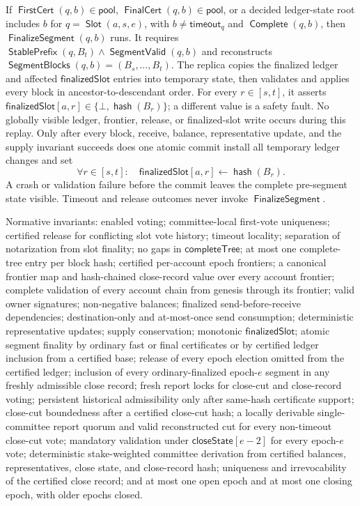 \documentclass[sigplan,twocolumn,review,anonymous]{acmart}
\newcommand{\func}[1]{\operatorname{\mathsf{#1}}}
\newcommand{\hash}{\func{hash}}
\newcommand{\FirstCert}{\func{FirstCert}}
\newcommand{\FinalCert}{\func{FinalCert}}
\newcommand{\Slot}{\func{Slot}}
\newcommand{\SegmentBlocks}{\func{SegmentBlocks}}
\newcommand{\SegmentValid}{\func{SegmentValid}}
\newcommand{\Complete}{\func{Complete}}
\newcommand{\timeoutVal}{\mathsf{timeout}}
\newcommand{\completeTree}{\mathsf{completeTree}}
\newcommand{\finalizedSlot}{\mathsf{finalizedSlot}}
\newcommand{\FinalizeSegment}{\func{FinalizeSegment}}
\newcommand{\closeState}{\mathsf{closeState}}
\newcommand{\StablePrefix}{\func{StablePrefix}}
\begin{document}
If \(\FirstCert(q,b)\in\mathsf{pool}\), \(\FinalCert(q,b)\in\mathsf{pool}\), or a decided
ledger-state root includes \(b\) for \(q=\Slot(a,s,e)\), with
\(b\neq\timeoutVal_q\) and \(\Complete(q,b)\), then \(\FinalizeSegment(q,b)\) runs.  It requires
\(\StablePrefix(q,B_t)\wedge\SegmentValid(q,b)\) and reconstructs
\(\SegmentBlocks(q,b)=(B_s,\ldots,B_t)\).  The replica copies the finalized ledger and affected
\(\finalizedSlot\) entries into temporary state, then validates and applies every block in
ancestor-to-descendant order.  For every \(r\in[s,t]\), it asserts
\(\finalizedSlot[a,r]\in\{\bot,\hash(B_r)\}\); a different value is a safety fault.  No globally visible
ledger, frontier, release, or finalized-slot write occurs during this replay.  Only after every block,
receive, balance, representative update, and the supply invariant succeeds does one atomic commit install
all temporary ledger changes and set
\[
\forall r\in[s,t]:\quad\finalizedSlot[a,r]\gets\hash(B_r).
\]
A crash or validation failure before the commit leaves the complete pre-segment state visible.  Timeout
and release outcomes never invoke \(\FinalizeSegment\).

Normative invariants: enabled voting; committee-local first-vote uniqueness; certified release for conflicting slot
vote history; timeout locality; separation of notarization from slot finality; no gaps in
\(\completeTree\); at most one complete-tree entry per block hash; certified per-account epoch
frontiers; a canonical frontier map and hash-chained close-record value over every account frontier; complete validation of every
account chain from genesis through its frontier; valid owner signatures; non-negative balances; finalized
send-before-receive dependencies; destination-only and at-most-once send consumption; deterministic
representative updates; supply conservation; monotonic \(\finalizedSlot\); atomic segment finality by ordinary fast or final certificates or by certified ledger inclusion from a certified base; release of every epoch election omitted from the certified ledger; inclusion of every ordinary-finalized epoch-\(e\) segment in any freshly admissible close record; fresh report locks for close-cut and close-record voting; persistent historical admissibility only after same-hash certificate support; close-cut boundedness after a
certified close-cut hash; a locally derivable single-committee report quorum and valid reconstructed cut for every non-timeout close-cut vote;
mandatory validation under \(\closeState[e-2]\) for every epoch-\(e\) vote; deterministic stake-weighted committee
derivation from certified balances, representatives, close state, and close-record hash; uniqueness and irrevocability of the certified close
record; and at most one open epoch and at most one closing epoch, with older epochs closed.
\end{document}
